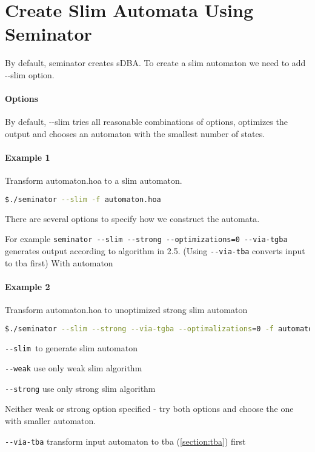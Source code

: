 \documentclass[
	digital
nolof, nolot
]{fithesis3}
\begin{document}
		\section{Create Slim Automata Using Seminator}
		By default, seminator creates sDBA. To create a slim automaton we need to add -{}-slim option. 
		\paragraph{Options} By default, -{}-slim tries all reasonable combinations of options, optimizes the output and chooses an automaton with the smallest number of states.
		
		\paragraph{Example 1}
		Transform automaton.hoa to a slim automaton.

		\begin{lstlisting}[language=bash]
$./seminator --slim -f automaton.hoa
		\end{lstlisting}
		
		There are several options to specify how we construct the automata.
		
		For example \texttt{seminator -{}-slim -{}-strong -{}-optimizations=0 -{}-via-tgba} generates output according to algorithm in 2.5. (Using \texttt{-{}-via-tba} converts input to tba first) With automaton
		
		
		\paragraph{Example 2}
		Transform automaton.hoa to unoptimized strong slim automaton
		\begin{lstlisting}[language=bash]
$./seminator --slim --strong --via-tgba --optimalizations=0 -f automaton.hoa
		\end{lstlisting}
		
		 
		
		\texttt{-{}-slim }to generate slim automaton
		
		\texttt{-{}-weak} use only weak slim algorithm
		
		\texttt{-{}-strong} use only strong slim algorithm
		
		Neither weak or strong option specified - try both options  and choose the one with smaller automaton.
		
		\texttt{-{}-via-tba} transform input automaton to tba (\ref{section:tba}) first
		
\end{document}
